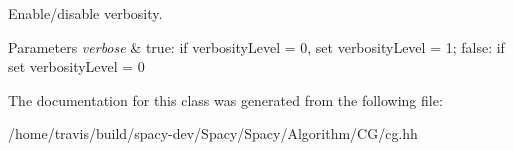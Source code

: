 Enable/disable verbosity. 


\begin{DoxyParams}{Parameters}
{\em verbose} & true\-: if verbosity\-Level = 0, set verbosity\-Level = 1; false\-: if set verbosity\-Level = 0 \\
\hline
\end{DoxyParams}


The documentation for this class was generated from the following file\-:\begin{DoxyCompactItemize}
\item 
/home/travis/build/spacy-\/dev/\-Spacy/\-Spacy/\-Algorithm/\-C\-G/cg.\-hh\end{DoxyCompactItemize}
